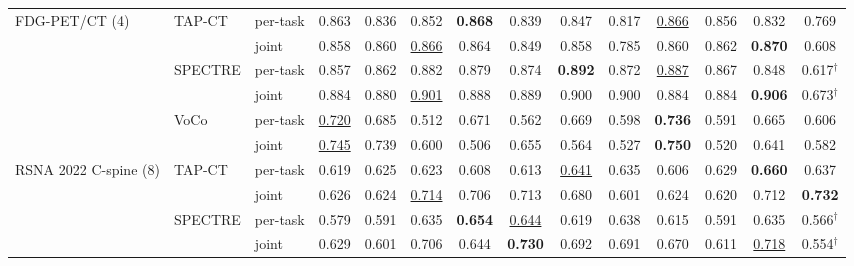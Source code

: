 \begin{tabular}{@{}lllccccccccccc@{}}
\addlinespace
FDG-PET/CT (4) & TAP-CT & per-task & \cellcolor{modebest}0.863 & 0.836 & 0.852 & \cellcolor{modebest}\textbf{0.868} & 0.839 & 0.847 & \cellcolor{modebest}0.817 & \cellcolor{modebest}\underline{0.866} & 0.856 & 0.832 & \cellcolor{modebest}0.769 \\
 &  & joint & 0.858 & \cellcolor{modebest}0.860 & \cellcolor{modebest}\underline{0.866} & 0.864 & \cellcolor{modebest}0.849 & \cellcolor{modebest}0.858 & 0.785 & 0.860 & \cellcolor{modebest}0.862 & \cellcolor{modebest}\textbf{0.870} & 0.608 \\
\addlinespace[1.5pt]
 & SPECTRE & per-task & 0.857 & 0.862 & 0.882 & 0.879 & 0.874 & \textbf{0.892} & 0.872 & \cellcolor{modebest}\underline{0.887} & 0.867 & 0.848 & 0.617$^{\dagger}$ \\
 &  & joint & \cellcolor{modebest}0.884 & \cellcolor{modebest}0.880 & \cellcolor{modebest}\underline{0.901} & \cellcolor{modebest}0.888 & \cellcolor{modebest}0.889 & \cellcolor{modebest}0.900 & \cellcolor{modebest}0.900 & 0.884 & \cellcolor{modebest}0.884 & \cellcolor{modebest}\textbf{0.906} & 0.673$^{\dagger}$ \\
\addlinespace[1.5pt]
 & VoCo & per-task & \underline{0.720} & 0.685 & 0.512 & \cellcolor{modebest}0.671 & 0.562 & \cellcolor{modebest}0.669 & \cellcolor{modebest}0.598 & \textbf{0.736} & \cellcolor{modebest}0.591 & \cellcolor{modebest}0.665 & \cellcolor{modebest}0.606 \\
 &  & joint & \cellcolor{modebest}\underline{0.745} & \cellcolor{modebest}0.739 & \cellcolor{modebest}0.600 & 0.506 & \cellcolor{modebest}0.655 & 0.564 & 0.527 & \cellcolor{modebest}\textbf{0.750} & 0.520 & 0.641 & 0.582 \\
\addlinespace
RSNA 2022 C-spine (8) & TAP-CT & per-task & 0.619 & \cellcolor{modebest}0.625 & 0.623 & 0.608 & 0.613 & \underline{0.641} & \cellcolor{modebest}0.635 & 0.606 & \cellcolor{modebest}0.629 & \textbf{0.660} & 0.637 \\
 &  & joint & \cellcolor{modebest}0.626 & 0.624 & \cellcolor{modebest}\underline{0.714} & \cellcolor{modebest}0.706 & \cellcolor{modebest}0.713 & \cellcolor{modebest}0.680 & 0.601 & \cellcolor{modebest}0.624 & 0.620 & \cellcolor{modebest}0.712 & \cellcolor{modebest}\textbf{0.732} \\
\addlinespace[1.5pt]
 & SPECTRE & per-task & 0.579 & 0.591 & 0.635 & \cellcolor{modebest}\textbf{0.654} & \underline{0.644} & 0.619 & 0.638 & 0.615 & 0.591 & 0.635 & 0.566$^{\dagger}$ \\
 &  & joint & \cellcolor{modebest}0.629 & \cellcolor{modebest}0.601 & \cellcolor{modebest}0.706 & 0.644 & \cellcolor{modebest}\textbf{0.730} & \cellcolor{modebest}0.692 & \cellcolor{modebest}0.691 & \cellcolor{modebest}0.670 & \cellcolor{modebest}0.611 & \cellcolor{modebest}\underline{0.718} & 0.554$^{\dagger}$ \\

\end{tabular}
